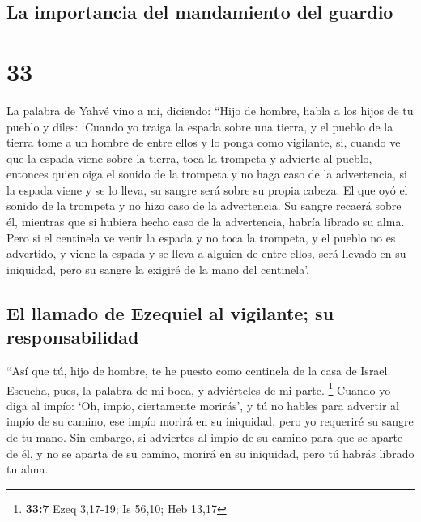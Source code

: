 \hypertarget{la-importancia-del-mandamiento-del-guardio}{%
\subsection{La importancia del mandamiento del
guardio}\label{la-importancia-del-mandamiento-del-guardio}}

\hypertarget{section-32}{%
\section{33}\label{section-32}}

 La palabra de Yahvé vino a mí, diciendo: 
``Hijo de hombre, habla a los hijos de tu pueblo y diles: `Cuando yo
traiga la espada sobre una tierra, y el pueblo de la tierra tome a un
hombre de entre ellos y lo ponga como vigilante,  si,
cuando ve que la espada viene sobre la tierra, toca la trompeta y
advierte al pueblo,  entonces quien oiga el sonido de la
trompeta y no haga caso de la advertencia, si la espada viene y se lo
lleva, su sangre será sobre su propia cabeza.  El que oyó
el sonido de la trompeta y no hizo caso de la advertencia. Su sangre
recaerá sobre él, mientras que si hubiera hecho caso de la advertencia,
habría librado su alma.  Pero si el centinela ve venir la
espada y no toca la trompeta, y el pueblo no es advertido, y viene la
espada y se lleva a alguien de entre ellos, será llevado en su
iniquidad, pero su sangre la exigiré de la mano del centinela'.

\hypertarget{el-llamado-de-ezequiel-al-vigilante-su-responsabilidad}{%
\subsection{El llamado de Ezequiel al vigilante; su
responsabilidad}\label{el-llamado-de-ezequiel-al-vigilante-su-responsabilidad}}

 ``Así que tú, hijo de hombre, te he puesto como centinela
de la casa de Israel. Escucha, pues, la palabra de mi boca, y
adviérteles de mi parte. \footnote{\textbf{33:7} Ezeq 3,17-19; Is 56,10;
  Heb 13,17}  Cuando yo diga al impío: `Oh, impío,
ciertamente morirás', y tú no hables para advertir al impío de su
camino, ese impío morirá en su iniquidad, pero yo requeriré su sangre de
tu mano.  Sin embargo, si adviertes al impío de su camino
para que se aparte de él, y no se aparta de su camino, morirá en su
iniquidad, pero tú habrás librado tu alma.

